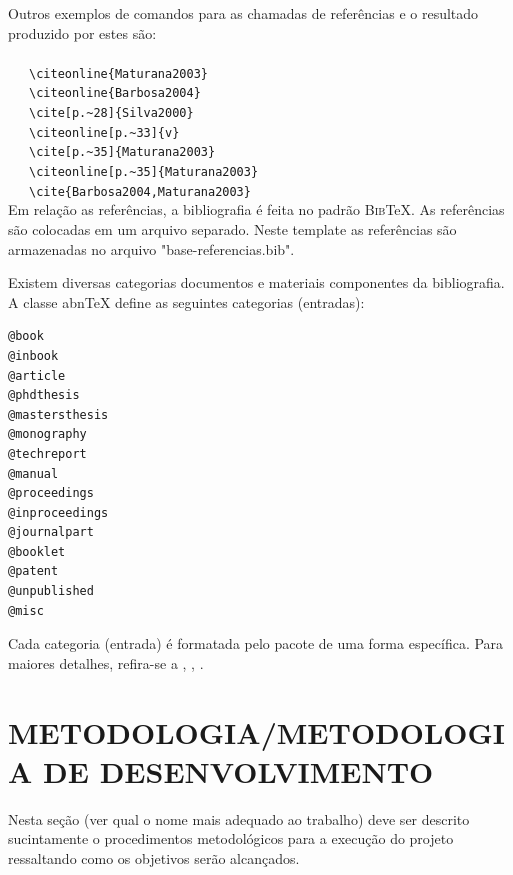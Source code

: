 Outros exemplos de comandos para as chamadas de referências e o resultado produzido por estes são:\\
\\ \ \ \  \verb|\citeonline{Maturana2003}|\\
 \ \ \   \verb|\citeonline{Barbosa2004}|\\
\cite[p.~28]{Silva2000} \ \ \  \verb|\cite[p.~28]{Silva2000}|\\
 \ \ \   \verb|\citeonline[p.~33]{v}|\\
\cite[p.~35]{Maturana2003} \ \ \   \verb|\cite[p.~35]{Maturana2003}|\\
 \ \ \   \verb|\citeonline[p.~35]{Maturana2003}|\\
\cite{Barbosa2004,Maturana2003} \ \ \   \verb|\cite{Barbosa2004,Maturana2003}|\\

Em relação as referências, a bibliografia é feita no padrão \textsc{Bib}\TeX{}. As referências são colocadas em um arquivo separado. Neste template as referências são armazenadas no arquivo "base-referencias.bib".

Existem diversas categorias documentos e materiais componentes da bibliografia. A classe abn\TeX{} define as seguintes categorias (entradas):

\begin{verbatim}
@book
@inbook
@article
@phdthesis
@mastersthesis
@monography
@techreport
@manual
@proceedings
@inproceedings
@journalpart
@booklet
@patent
@unpublished
@misc
\end{verbatim}

Cada categoria (entrada) é formatada pelo pacote  de uma forma específica. Para maiores detalhes, refira-se a , , .

\section{METODOLOGIA/METODOLOGIA DE DESENVOLVIMENTO} %
\label{sec:metodologia}
Nesta seção (ver qual o nome mais adequado ao trabalho) deve ser descrito sucintamente o procedimentos metodológicos para a execução do projeto ressaltando como os objetivos serão alcançados.

